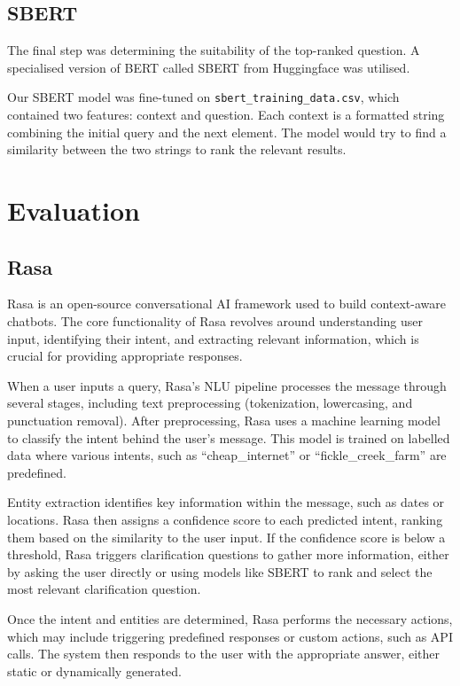 \documentclass[11pt]{article}
\begin{document}
\subsection{SBERT}
The final step was determining the suitability of the top-ranked question. A specialised version of BERT called SBERT from Huggingface was utilised.

Our SBERT model was fine-tuned on \texttt{sbert\_training\_data.csv}, which contained two features: context and question. Each context is a formatted string combining the initial query and the next element. The model would try to find a similarity between the two strings to rank the relevant results.


\section{Evaluation}
\subsection{Rasa}
Rasa is an open-source conversational AI framework used to build context-aware chatbots. The core functionality of Rasa revolves around understanding user input, identifying their intent, and extracting relevant information, which is crucial for providing appropriate responses. 

When a user inputs a query, Rasa's NLU pipeline processes the message through several stages, including text preprocessing (tokenization, lowercasing, and punctuation removal). After preprocessing, Rasa uses a machine learning model to classify the intent behind the user's message. This model is trained on labelled data where various intents, such as “cheap\_internet” or “fickle\_creek\_farm” are predefined.

Entity extraction identifies key information within the message, such as dates or locations. Rasa then assigns a confidence score to each predicted intent, ranking them based on the similarity to the user input. If the confidence score is below a threshold, Rasa triggers clarification questions to gather more information, either by asking the user directly or using models like SBERT to rank and select the most relevant clarification question.

Once the intent and entities are determined, Rasa performs the necessary actions, which may include triggering predefined responses or custom actions, such as API calls. The system then responds to the user with the appropriate answer, either static or dynamically generated.
\end{document}
